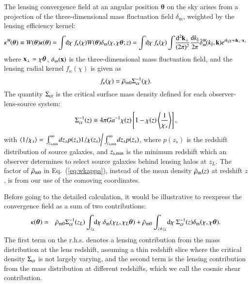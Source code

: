 \documentclass[onecolumn,notitlepage,showpacs,amsmath,amssymb,prd,floatfix]{revtex4-1}
\def\ave#1{\left\langle #1 \right\rangle}
\newcommand{\bx}{{\bf x}}
\newcommand{\bk}{{\bf k}}
\newcommand{\btheta}{{\bm{\theta}}}
\newcommand{\dr}{\mathrm{d}}
\newcommand{\deltam}{\delta_{\mathrm{m}}}
\newcommand{\sigmacri}{\Sigma_{\rm cr}^{-1}}
\newcommand{\sigmacr}{\Sigma_{\rm cr}}
\begin{document}
The lensing convergence field at an angular position $\btheta$ on the sky
arises from a projection of the three-dimensional mass fluctuation field
$\deltam$, weighted by the lensing efficiency kernel:
%
\begin{equation}
 \kappa^W\!(\btheta)\equiv W(\btheta)\kappa(\btheta)=
  \int\!\dr\chi~
 f_\kappa(\chi)W(\btheta)\deltam(\chi,\chi\btheta;z)
 =\int\!\dr\chi~
 f_\kappa(\chi)
 \int\!\frac{\dr^2\bk_\perp}{(2\pi)^2}
 \frac{\dr k_\parallel}{2\pi}\tilde{\delta}_{\rm m}^W\!(k_\parallel,\bk)e^{ik_\parallel\chi+i\bk_\perp\cdot\bx_\perp}
\label{eq:wkappa}
\end{equation}
%
where $\bx_\perp=\chi\btheta$, $\delta_m(\bx)$ is the three-dimensional
mass fluctuation field, and the lensing radial kernel $f_\kappa(\chi)$
is given as
%
\begin{equation}
 f_\kappa(\chi)=\bar{\rho}_{\rm m0} \sigmacri(\chi).
  \label{eq:fkappa}
\end{equation}
%
The quantity $\sigmacr$ is the critical surface mass density defined for
each observer-lens-source system:
%
\begin{equation}
\sigmacri(z)\equiv 4\pi Ga^{-1}\chi(z)\left[1-\chi(z)\ave{\frac{1}{\chi_s}}\right],
\end{equation}
%
with 
$\ave{1/\chi_s}=
\left.\int_{z_{\rm s,min}}^\infty\!dz_s
 p(z_s)1/\chi(z_s)\right/
 \int_{z_{\rm s,min}}^\infty\!dz_s p(z_s)$,
%
where $p(z_s)$ is the redshift distribution of source galaxies, and
$z_{\rm s,min}$ is the minimum redshift which an observer determines to
select source galaxies behind lensing halos at $z_L$.  The factor of
$\bar{\rho}_{\rm m0}$ in Eq.~(\ref{eq:wkappa}), instead of the mean
density $\bar{\rho}_{\rm m}(z)$ at redshift $z$, is from our use of the
comoving coordinates.

Before going to the detailed calculation, it would be illustrative to
reexpress the convergence field as a sum of two contributions:
%
\begin{eqnarray}
\kappa(\btheta)&\simeq&
 \bar{\rho}_{\rm
 m0}\sigmacri(z_L)\int_{z_L}\!\!\dr\chi~\deltam(\chi_L,\chi_L\btheta)+
\bar{\rho}_{\rm m0}\int_{z\ne z_L}\!\dr\chi~
\sigmacri(z)\deltam(\chi,\chi \btheta).
\label{eq:kappa_cocept}
\end{eqnarray}
%
The first term on the r.h.s. denotes a lensing contribution from the
mass distribution  at the lens redshift, assuming a thin redshift slice
where the critical density $\sigmacr$ is not largely varying,
and the second term is the lensing
contribution from the mass distribution at different redshifts, which we
call the cosmic shear contribution.
\end{document}
